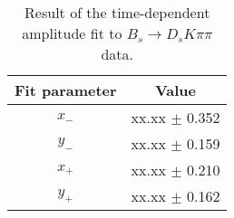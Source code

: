 \begin{table}[h]
\centering
\caption{Result of the time-dependent amplitude fit to $B_s \to D_s K \pi \pi$ data.}
\begin{tabular}{c c}
\hline
\hline
Fit parameter & Value \\
\hline
$x_{-}$ &  xx.xx  $\pm$ 0.352\\
$y_{-}$ &  xx.xx  $\pm$ 0.159\\
$x_{+}$ &  xx.xx  $\pm$ 0.210\\
$y_{+}$ &  xx.xx  $\pm$ 0.162\\
\hline
\hline
\end{tabular}
\label{table:fullFit_signal}
\end{table}